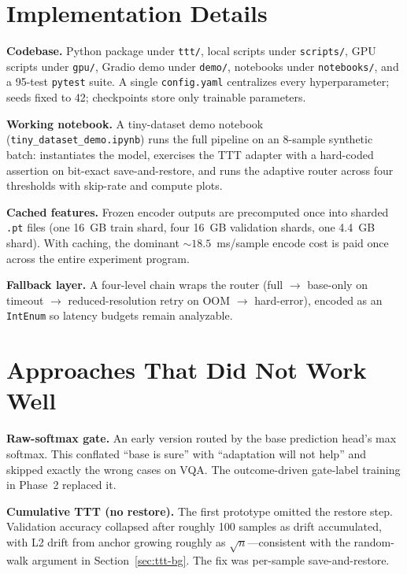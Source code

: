 \documentclass[conference]{IEEEtran}
\begin{document}
\appendices

\section{Implementation Details}

\textbf{Codebase.} Python package under \texttt{ttt/}, local scripts
under \texttt{scripts/}, GPU scripts under \texttt{gpu/}, Gradio demo
under \texttt{demo/}, notebooks under \texttt{notebooks/}, and a
95-test \texttt{pytest} suite. A single \texttt{config.yaml}
centralizes every hyperparameter; seeds fixed to 42; checkpoints
store only trainable parameters.

\textbf{Working notebook.} A tiny-dataset demo notebook
(\texttt{tiny\_dataset\_demo.\allowbreak ipynb}) runs the full
pipeline on an 8-sample synthetic batch: instantiates the model,
exercises the TTT adapter with a hard-coded assertion on bit-exact
save-and-restore, and runs the adaptive router across four
thresholds with skip-rate and compute plots.

\textbf{Cached features.} Frozen encoder outputs are precomputed
once into sharded \texttt{.pt} files (one 16~GB train shard, four
16~GB validation shards, one 4.4~GB shard). With caching, the
dominant ${\sim}18.5$~ms/sample encode cost is paid once across the
entire experiment program.

\textbf{Fallback layer.} A four-level chain wraps the router (full
$\to$ base-only on timeout $\to$ reduced-resolution retry on OOM
$\to$ hard-error), encoded as an \texttt{IntEnum} so latency budgets
remain analyzable.

\section{Approaches That Did Not Work Well}

\textbf{Raw-softmax gate.} An early version routed by the base
prediction head's max softmax. This conflated ``base is sure'' with
``adaptation will not help'' and skipped exactly the wrong cases on
VQA. The outcome-driven gate-label training in Phase~2 replaced it.

\textbf{Cumulative TTT (no restore).} The first prototype omitted
the restore step. Validation accuracy collapsed after roughly 100
samples as drift accumulated, with L2 drift from anchor growing
roughly as $\sqrt{n}$---consistent with the random-walk argument in
Section~\ref{sec:ttt-bg}. The fix was per-sample save-and-restore.
\end{document}
